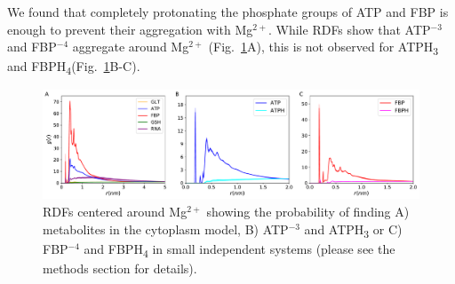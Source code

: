 \documentclass[journal=jcisd8,manuscript=article]{achemso}
\begin{document}
We found that completely protonating the phosphate groups of ATP and
FBP is enough to prevent their aggregation with Mg$^{2+}$. While RDFs
show that ATP$^{-3}$ and FBP$^{-4}$ aggregate around Mg$^{2+}$
(Fig.~\ref{fig:avoiding_aggregation}A), this is not observed for
ATPH\textsubscript{3} and
FBPH\textsubscript{4}(Fig.~\ref{fig:avoiding_aggregation}B-C).  

\begin{figure}[H]
\hspace*{-2cm}\includegraphics[scale=0.5]{rdf_mg.pdf}
\caption{RDFs centered around Mg$^{2+}$ showing the probability of
  finding A) metabolites in the cytoplasm model, B) ATP$^{-3}$ and
  ATPH\textsubscript{3} or C) FBP$^{-4}$ and FBPH\textsubscript{4} in
  small independent systems (please see the methods section for
  details).}
\label{fig:avoiding_aggregation}
\end{figure}


 
\end{document}
